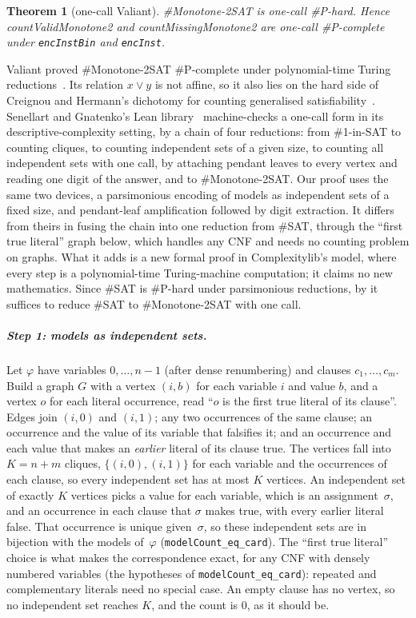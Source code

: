 \documentclass[pdflatex,sn-mathphys-num]{sn-jnl}
\theoremstyle{thmstyleone}
\newtheorem{theorem}{Theorem}
\theoremstyle{thmstylethree}
\begin{document}
\begin{theorem}[one-call Valiant]
\label{thm:valiant}
\#Monotone-2SAT is one-call \#P-hard. Hence \textit{countValidMonotone2} and
\textit{countMissingMonotone2} are one-call \#P-complete under \lstinline{encInstBin} and
\lstinline{encInst}.
\end{theorem}

Valiant proved \#Monotone-2SAT \#P-complete under polynomial-time Turing
reductions~\cite{Valiant1979enumeration}. Its relation $x \lor y$ is not affine, so it also lies
on the hard side of Creignou and Hermann's dichotomy for counting generalised
satisfiability~\cite{CreignouHermann1996}. Senellart and
Gnatenko's Lean library~\cite{DescriptiveComplexityLib} machine-checks a one-call form in its
descriptive-complexity setting, by a chain of four reductions: from \#1-in-SAT to counting
cliques, to counting independent sets of a given size, to counting all independent sets with one
call, by attaching pendant leaves to every vertex and reading one digit of the answer, and to
\#Monotone-2SAT. Our proof uses the same two devices, a parsimonious encoding of models as
independent sets of a fixed size, and pendant-leaf amplification followed by digit extraction.
It differs from theirs in fusing the chain into one reduction from
\#SAT, through the ``first true literal'' graph below, which handles any CNF and needs no
counting problem on graphs. What it adds is a new formal proof in Complexitylib's model, where
every step is a polynomial-time Turing-machine computation; it claims no new mathematics. Since
\#SAT is \#P-hard under parsimonious reductions, by  it suffices to reduce
\#SAT to \#Monotone-2SAT with one call.

\subparagraph*{Step 1: models as independent sets.}
Let $\varphi$ have variables $0, \dots, n-1$ (after dense renumbering) and clauses
$c_1, \dots, c_m$. Build a graph $G$ with a vertex $(i, b)$ for each variable $i$ and value $b$,
and a vertex $o$ for each literal occurrence, read ``$o$ is the first true literal of its
clause''. Edges join $(i, 0)$ and $(i, 1)$; any two occurrences of the same clause; an
occurrence and the value of its variable that falsifies it; and an occurrence and each value
that makes an \emph{earlier} literal of its clause true. The vertices fall into $K = n + m$
cliques, $\{(i,0),(i,1)\}$ for each variable and the occurrences of each clause, so every
independent set has at most $K$ vertices. An independent set of exactly $K$ vertices picks a
value for each variable, which is an assignment~$\sigma$, and an occurrence in each clause that
$\sigma$ makes true, with every earlier literal false. That occurrence is unique given~$\sigma$,
so these independent sets are in bijection with the models of~$\varphi$
(\lstinline{modelCount_eq_card}). The ``first true literal'' choice is what makes the
correspondence exact, for any CNF with densely numbered variables (the hypotheses of
\lstinline{modelCount_eq_card}): repeated and complementary literals need no special case. An
empty clause has no vertex, so no independent set reaches $K$, and the count is $0$, as it should
be.
\end{document}
